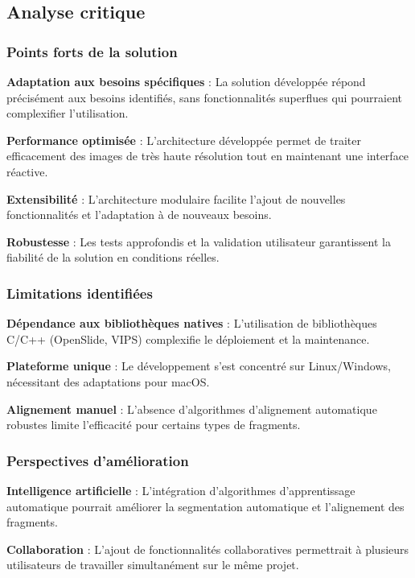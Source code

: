 \documentclass[12pt,a4paper]{report}
\begin{document}
\subsection{Analyse critique}

\subsubsection{Points forts de la solution}

\textbf{Adaptation aux besoins spécifiques} : La solution développée répond précisément aux besoins identifiés, sans fonctionnalités superflues qui pourraient complexifier l'utilisation.

\textbf{Performance optimisée} : L'architecture développée permet de traiter efficacement des images de très haute résolution tout en maintenant une interface réactive.

\textbf{Extensibilité} : L'architecture modulaire facilite l'ajout de nouvelles fonctionnalités et l'adaptation à de nouveaux besoins.

\textbf{Robustesse} : Les tests approfondis et la validation utilisateur garantissent la fiabilité de la solution en conditions réelles.

\subsubsection{Limitations identifiées}

\textbf{Dépendance aux bibliothèques natives} : L'utilisation de bibliothèques C/C++ (OpenSlide, VIPS) complexifie le déploiement et la maintenance.

\textbf{Plateforme unique} : Le développement s'est concentré sur Linux/Windows, nécessitant des adaptations pour macOS.

\textbf{Alignement manuel} : L'absence d'algorithmes d'alignement automatique robustes limite l'efficacité pour certains types de fragments.

\subsubsection{Perspectives d'amélioration}

\textbf{Intelligence artificielle} : L'intégration d'algorithmes d'apprentissage automatique pourrait améliorer la segmentation automatique et l'alignement des fragments.

\textbf{Collaboration} : L'ajout de fonctionnalités collaboratives permettrait à plusieurs utilisateurs de travailler simultanément sur le même projet.
\end{document}
